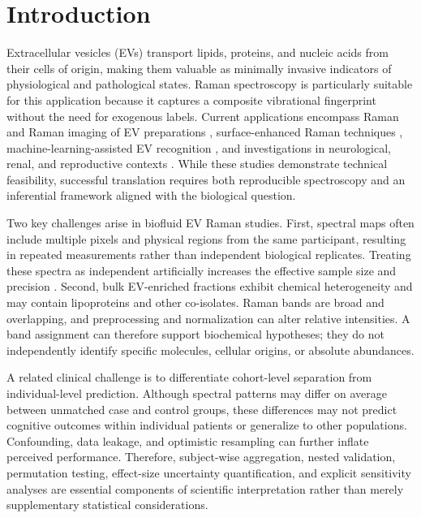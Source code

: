 \documentclass[preprint,12pt]{elsarticle}
\begin{document}
\section{Introduction} 
\label{sec:introduction}

Extracellular vesicles (EVs) transport lipids, proteins, and nucleic acids from their cells of origin, making them valuable as minimally invasive indicators of physiological and pathological states. Raman spectroscopy is particularly suitable for this application because it captures a composite vibrational fingerprint without the need for exogenous labels. Current applications encompass Raman and Raman imaging of EV preparations \cite{horgan2020,liu2025}, surface-enhanced Raman techniques \cite{koster2021}, machine-learning-assisted EV recognition \cite{jensen2024,lee2020}, and investigations in neurological, renal, and reproductive contexts \cite{imanbekova2021,kaminska2022,zhang2020}. While these studies demonstrate technical feasibility, successful translation requires both reproducible spectroscopy and an inferential framework aligned with the biological question.

Two key challenges arise in biofluid EV Raman studies. First, spectral maps often include multiple pixels and physical regions from the same participant, resulting in repeated measurements rather than independent biological replicates. Treating these spectra as independent artificially increases the effective sample size and precision \cite{hurlbert1984,lazic2010}. Second, bulk EV-enriched fractions exhibit chemical heterogeneity and may contain lipoproteins and other co-isolates. Raman bands are broad and overlapping, and preprocessing and normalization can alter relative intensities. A band assignment can therefore support biochemical hypotheses; they do not independently identify specific molecules, cellular origins, or absolute abundances.

A related clinical challenge is to differentiate cohort-level separation from individual-level prediction. Although spectral patterns may differ on average between unmatched case and control groups, these differences may not predict cognitive outcomes within individual patients or generalize to other populations. Confounding, data leakage, and optimistic resampling can further inflate perceived performance. Therefore, subject-wise aggregation, nested validation, permutation testing, effect-size uncertainty quantification, and explicit sensitivity analyses are essential components of scientific interpretation rather than merely supplementary statistical considerations.
\end{document}
